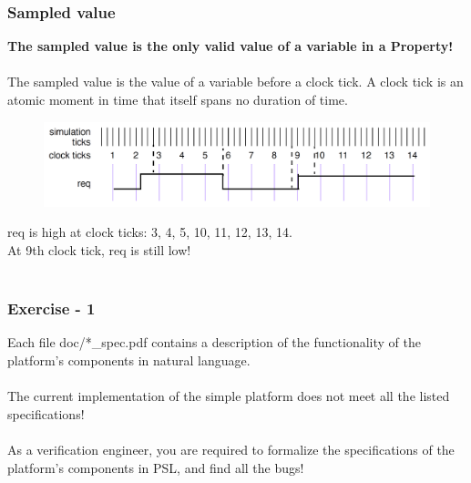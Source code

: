 \documentclass{beamer}
\begin{document}
\begin{frame}

\frametitle{Sampled value}
\textbf{The sampled value is the only valid value of a variable in a Property!}\\~\\
The sampled value is the value of a variable before a clock tick.
A clock tick is an atomic moment in time that itself spans no duration of time.

\begin{figure}
\centering
\includegraphics[width=0.9\columnwidth]{figures/sampled_value.png}
\end{figure}

req is high at clock ticks: 3, 4, 5, 10, 11, 12, 13, 14.\\
At 9th clock tick, req is still low!\\~\\

\end{frame}

\begin{frame}

\frametitle{Exercise - 1}

Each file doc/*\_spec.pdf contains a description of the functionality
of the platform's components in natural language.\\~\\

The current implementation of the simple platform does not meet all the 
listed specifications!\\~\\

As a verification engineer, you are required to formalize the specifications
of the platform's components in PSL, and find all the bugs!   
 
\end{frame}
\end{document}
